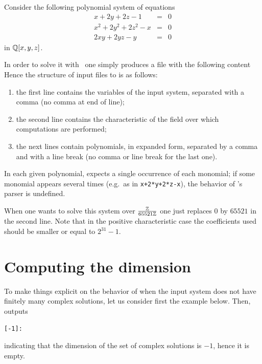 \documentclass[a4paper,english,11pt]{scrartcl}
\theoremstyle{definition}
\theoremstyle{remark}
\begin{document}
Consider the following polynomial system of equations
\[
  \begin{array}{rcl}
    x+2 y+2 z-1 &= &0\\
    x^2+2 y^2+2 z^2-x &= &0\\
    2 x y+2 y z-y &= &0
  \end{array}
\]
in $\mathbb{Q}[x,y,z]$.

In order to solve it with \msolve~one simply produces a file with the following content
Hence the structure of input files to \msolve is as follows:
\begin{enumerate}
\item the first line contains the variables of the input system, separated with
  a comma (no comma at end of line);
\item the second line contains the characteristic of the field over which
  computations are performed;
\item the next lines contain polynomials, in expanded form, separated by a comma
   and with a line break (no comma or line break for the last one).
\end{enumerate}

In each given polynomial, \msolve expects a single occurrence of each monomial;
if some monomial appears several times (e.g.\ as in \verb#x+2*y+2*z-x#),
the behavior of \msolve's parser is undefined.

When one wants to solve this system over $\frac{\mathbb{Z}}{65521\mathbb{Z}}$ one just replaces
$0$ by $65521$ in the second line. Note that in the positive characteristic case
the coefficients used should be smaller or equal to $2^{31}-1$.


\section{Computing the dimension}\label{sec:dim}

To make things explicit on the behavior of \msolve when the input system
does not have finitely many complex solutions, let us consider first the example
below.
Then, \msolve outputs
\begin{tcolorbox} %
  \begin{lstlisting}[basicstyle=\normalsize\ttfamily]
[-1]:
  \end{lstlisting}
\end{tcolorbox}
indicating that the dimension of the set of complex solutions is $-1$, hence it
is empty.
\end{document}

